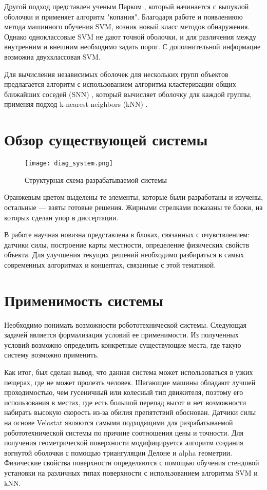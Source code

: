 Другой подход представлен ученым Парком \cite{parkNewConcaveHull2012}, который начинается с выпуклой оболочки и применяет алгоритм "копания". Благодаря работе \cite{j.a.leonardUsingRadialBasis1992} и появлениюю метода машинного обучения  SVM, возник новый класс методов обнаружения. Однако одноклассовые SVM не дают точной оболочки, и для различения между внутренним и внешним необходимо задать порог. С дополнительной информацие возможна двухклассовая SVM. 

Для вычисления независимых оболочек для нескольких групп объектов предлагается алгоритм с использованием алгоритма кластеризации общих ближайших соседей (SNN) , который вычисляет оболочку для каждой группы, применяя подход k-nearest neighbors (kNN) \cite{moreiraConcaveHullKnearest2007,ertozNewSharedNearest2002,chauBorderSamplesDetection2011,xiaBORDEREfficientComputation2006}.

\section{Обзор существующей системы}
\begin{figure}[H]
    \centering\texttt{[image: diag\_system.png]}
    \caption{Структурная схема разрабатываемой системы}
    \label{fig:diag_system.png}
\end{figure}

Оранжевым цветом выделены те элементы, которые были разработаны и изучены, остальные --- взяты готовые решения. Жирными стрелками показаны те блоки, на которых сделан упор в диссертации.

В работе научная новизна представлена в блоках, связанных с очувствлением: датчики силы, построение карты местности, определение физических свойств объекта. Для улучшения текущих решений необходимо разбираться в самых современных алгоритмах и концептах, связанные с этой тематикой.


\section{Применимость системы}
Необходимо понимать возможности робототехнической системы. Следующая задачей является формализация условий ее применимости. Из полученных условий возможно определить конкретные существующие места, где такую систему возможно применить.

Как итог, был сделан вывод, что данная система может использоваться в узких пещерах, где не может пролезть человек. Шагающие машины обладают лучшей проходимостью, чем гусеничный или колесный тип движителя, поэтому его использования в местах, где есть большой перепад высот и нет возможности набирать высокую скорость из-за обилия препятствий обоснован. Датчики силы на основе Velostat являются самыми подходящими для разрабатываемой робототехнической системы по причине соотношения цены и точности. Для получения геометрической поверхности модифицируется алгоритм создания вогнутой оболочки с помощью триангуляции Делоне и alpha геометрии. Физические свойства поверхности определяются с помощью обучения стендовой установки на различных типах поверхности с использованием алгоритма SVM и kNN.